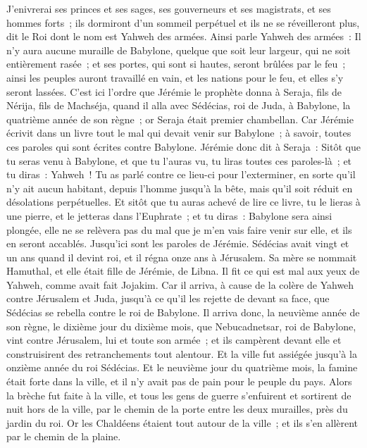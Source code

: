 \begin{multicols}{2}
J'enivrerai ses princes et ses sages, ses gouverneurs et ses magistrats, et ses hommes forts~; ils dormiront d'un sommeil perpétuel et ils ne se réveilleront plus, dit le Roi dont le nom est Yahweh des armées.
Ainsi parle Yahweh des armées~: Il n'y aura aucune muraille de Babylone, quelque que soit leur largeur, qui ne soit entièrement rasée~; et ses portes, qui sont si hautes, seront brûlées par le feu~; ainsi les peuples auront travaillé en vain, et les nations pour le feu, et elles s'y seront lassées.
C'est ici l'ordre que Jérémie le prophète donna à Seraja, fils de Nérija, fils de Machséja, quand il alla avec Sédécias, roi de Juda, à Babylone, la quatrième année de son règne~; or Seraja était premier chambellan.
Car Jérémie écrivit dans un livre tout le mal qui devait venir sur Babylone~; à savoir, toutes ces paroles qui sont écrites contre Babylone.
Jérémie donc dit à Seraja~: Sitôt que tu seras venu à Babylone, et que tu l'auras vu, tu liras toutes ces paroles-là~;
et tu diras~: Yahweh~! Tu as parlé contre ce lieu-ci pour l'exterminer, en sorte qu'il n'y ait aucun habitant, depuis l'homme jusqu'à la bête, mais qu'il soit réduit en désolations perpétuelles.
Et sitôt que tu auras achevé de lire ce livre, tu le lieras à une pierre, et le jetteras dans l'Euphrate~;
et tu diras~: Babylone sera ainsi plongée, elle ne se relèvera pas du mal que je m'en vais faire venir sur elle, et ils en seront accablés. Jusqu'ici sont les paroles de Jérémie.
\VerseOne{}Sédécias avait vingt et un ans quand il devint roi, et il régna onze ans à Jérusalem. Sa mère se nommait Hamuthal, et elle était fille de Jérémie, de Libna.
Il fit ce qui est mal aux yeux de Yahweh, comme avait fait Jojakim.
Car il arriva, à cause de la colère de Yahweh contre Jérusalem et Juda, jusqu'à ce qu'il les rejette de devant sa face, que Sédécias se rebella contre le roi de Babylone.
Il arriva donc, la neuvième année de son règne, le dixième jour du dixième mois, que Nebucadnetsar, roi de Babylone, vint contre Jérusalem, lui et toute son armée~; et ils campèrent devant elle et construisirent des retranchements tout alentour.
Et la ville fut assiégée jusqu'à la onzième année du roi Sédécias.
Et le neuvième jour du quatrième mois, la famine était forte dans la ville, et il n'y avait pas de pain pour le peuple du pays.
Alors la brèche fut faite à la ville, et tous les gens de guerre s'enfuirent et sortirent de nuit hors de la ville, par le chemin de la porte entre les deux murailles, près du jardin du roi. Or les Chaldéens étaient tout autour de la ville~; et ils s'en allèrent par le chemin de la plaine.

\end{multicols}
